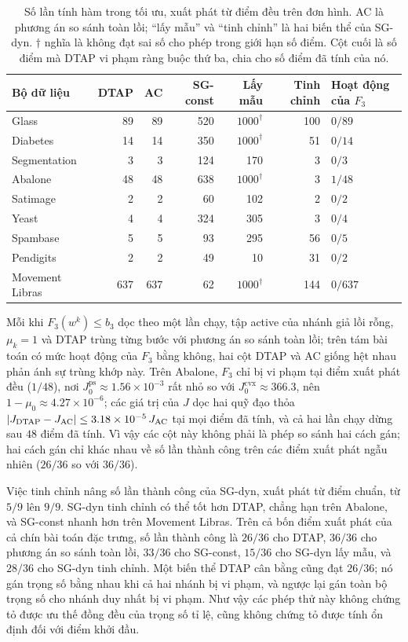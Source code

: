 \documentclass[]{interact}
\theoremstyle{plain}
\theoremstyle{definition}
\theoremstyle{remark}
\newcommand{\cvx}{\mathrm{cvx}}
\newcommand{\ps}{\mathrm{ps}}
\begin{document}
\begin{table}[t]
\centering\small
\setlength{\tabcolsep}{4pt}
\caption{Số lần tính hàm trong tối ưu, xuất phát từ điểm đều trên đơn hình.
AC là phương án so sánh toàn lồi; ``lấy mẫu'' và ``tinh chỉnh'' là hai biến thể của SG-dyn.
$\dagger$ nghĩa là không đạt sai số cho phép trong giới hạn số điểm.
Cột cuối là số điểm mà DTAP vi phạm ràng buộc thứ ba, chia cho
số điểm đã tính của nó.}
\label{tab:activation-tuning}
\begin{tabular}{@{}lrrrrrl@{}}
\toprule
Bộ dữ liệu & DTAP & AC & SG-const & Lấy mẫu & Tinh chỉnh & Hoạt động của $F_3$\\
\midrule
Glass        & 89 & 89 & 520 & $1000^\dagger$ & 100 & $0/89$\\
Diabetes     & 14 & 14 & 350 & $1000^\dagger$ & 51 & $0/14$\\
Segmentation & 3 & 3 & 124 & 170 & 3 & $0/3$\\
Abalone      & 48 & 48 & 638 & $1000^\dagger$ & 3 & $1/48$\\
Satimage     & 2 & 2 & 60 & 102 & 2 & $0/2$\\
Yeast        & 4 & 4 & 324 & 305 & 3 & $0/4$\\
Spambase     & 5 & 5 & 93 & 295 & 56 & $0/5$\\
Pendigits    & 2 & 2 & 49 & 10 & 31 & $0/2$\\
\midrule
Movement Libras & 637 & 637 & 62 & $1000^\dagger$ & 144 & $0/637$\\
\bottomrule
\end{tabular}
\end{table}

Mỗi khi $F_3(w^k)\le b_3$ dọc theo một lần chạy, tập active của nhánh giả lồi rỗng,
$\mu_k=1$ và DTAP trùng từng bước với phương án so sánh toàn lồi;
trên tám bài toán có mức hoạt động của $F_3$ bằng không, hai cột DTAP và AC giống hệt nhau
phản ánh sự trùng khớp này. Trên Abalone, $F_3$ chỉ bị vi phạm tại điểm xuất phát
đều ($1/48$), nơi $J^{\ps}_0\approx1.56\times10^{-3}$ rất nhỏ so với
$J^{\cvx}_0\approx366.3$, nên $1-\mu_0\approx4.27\times10^{-6}$; các giá trị của $J$
dọc hai quỹ đạo thỏa $|J_{\rm DTAP}-J_{\rm AC}|\le3.18\times10^{-5}\,J_{\rm AC}$ tại
mọi điểm đã tính,
và cả hai lần chạy dừng sau $48$ điểm đã tính. Vì vậy các cột này
không phải là phép so sánh hai cách gán; hai cách gán chỉ khác nhau về số lần thành công
trên các điểm xuất phát ngẫu nhiên ($26/36$ so với $36/36$).

Việc tinh chỉnh nâng số lần thành công của SG-dyn, xuất phát từ điểm chuẩn, từ $5/9$ lên $9/9$.
SG-dyn tinh chỉnh có thể tốt hơn DTAP, chẳng hạn trên Abalone, và SG-const nhanh hơn
trên Movement Libras. Trên cả bốn điểm xuất phát của cả chín bài toán đặc trưng,
số lần thành công là $26/36$ cho DTAP, $36/36$ cho phương án so sánh toàn lồi,
$33/36$ cho SG-const, $15/36$ cho SG-dyn lấy mẫu, và $28/36$
cho SG-dyn tinh chỉnh. Một biến thể DTAP cân bằng cũng đạt $26/36$; nó gán
trọng số bằng nhau khi cả hai nhánh bị vi phạm, và ngược lại gán toàn bộ trọng số cho nhánh duy nhất bị vi phạm.
Như vậy các phép thử này không chứng tỏ được ưu thế đồng đều của trọng số tỉ lệ,
cũng không chứng tỏ được tính ổn định đối với điểm khởi đầu.
\end{document}
